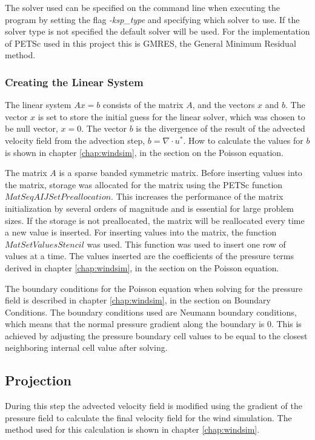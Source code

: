The solver used can be specified on the command line when executing the program
by setting the flag \emph{-ksp\_type} and specifying which solver to use. If the 
solver type is not specified the default solver will be used. For the
implementation of PETSc used in this project this is GMRES, the General Minimum
Residual method.

\subsubsection{Creating the Linear System}

The linear system $Ax = b$ consists of the matrix $A$, and the vectors $x$ and
$b$. The vector $x$ is set to store the initial guess for the linear solver,
which was chosen to be null vector, $x = 0$. The vector $b$ is the divergence of
the result of the advected velocity field from the advection step, $b = \nabla
\cdot u^*$. How to calculate the values for $b$ is shown in chapter 
\ref{chap:windsim}, in the section on the Poisson equation.

The matrix $A$ is a sparse banded symmetric matrix. Before inserting values into
the matrix, storage was allocated for the matrix using the PETSc function
$MatSeqAIJSetPreallocation$. This increases the performance of the matrix
initialization by several orders of magnitude and is essential for large problem
sizes. If the storage is not preallocated, the matrix will be reallocated every
time a new value is inserted. For inserting values into the matrix, the function
$MatSetValuesStencil$ was used. This function was used to insert one row of 
values at a time. The values inserted are the coefficients of the pressure terms
derived in chapter \ref{chap:windsim}, in the section on the Poisson equation.

The boundary conditions for the Poisson equation when solving for the pressure
field is described in chapter \ref{chap:windsim}, in the section on Boundary
Conditions. The boundary conditions used are Neumann boundary conditions, which
means that the normal pressure gradient along the boundary is 0. This is achieved
by adjusting the pressure boundary cell values to be equal to the closest
neighboring internal cell value after solving.

\subsection{Projection}

During this step the advected velocity field is modified using the gradient of
the pressure field to calculate the final velocity field for the wind simulation.
The method used for this calculation is shown in chapter \ref{chap:windsim}.
